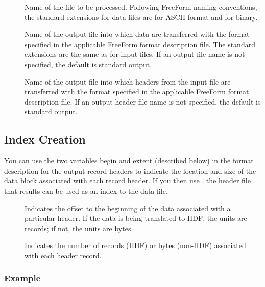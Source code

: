 \begin{description}
\item[ ]
  
  Name of the file to be processed. Following FreeForm naming
  conventions, the standard extensions for data files are 
  for ASCII format and  for binary.

\item[ ]
  
  Name of the output file into which data are transferred with the
  format specified in the applicable FreeForm format description file.
  The standard extensions are the same as for input files. If an
  output file name is not specified, the default is standard output.

\item[ ]
  
  Name of the output file into which headers from the input file are
  transferred with the format specified in the applicable FreeForm
  format description file. If an output header file name is not
  specified, the default is standard output.
\end{description}

\subsection{Index Creation}

You can use the two variables begin and extent (described below) in
the format description for the output record headers to indicate the
location and size of the data block associated with each record
header. If you then use , the header file that results
can be used as an index to the data file.

\begin{description}

\item[]
  
  Indicates the offset to the beginning of the data associated with a
  particular header. If the data is being translated to HDF, the units
  are records; if not, the units are bytes.

\item[]
  
  Indicates the number of records (HDF) or bytes (non-HDF) associated
  with each header record.
\end{description}

\subsubsection{Example}

